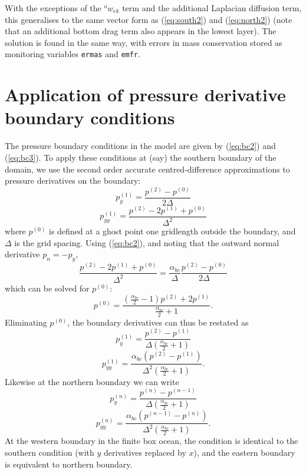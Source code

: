 \documentclass[11pt, a4paper,twoside]{article}
\newcommand{\ek}[1]{{{}^{#1}w_{ek}}}
\newcommand{\alphbc}[1]{{}^{#1}\alpha_{bc}}
\numberwithin{equation}{section}
\begin{document}
With the exceptions of the $\ek{o}$ term and the additional Laplacian diffusion term, this generalises to the same vector form as (\ref{eq:south2}) and (\ref{eq:north2}) (note that an additional bottom drag term also appears in the lowest layer).
The solution is found in the same way, with errors in mass conservation stored as monitoring variables \verb=ermas= and \verb=emfr=.


\section{Application of pressure derivative boundary conditions}\label{app:bcs}
The pressure boundary conditions in the model are given by (\ref{eq:bc2}) and (\ref{eq:bc3}).
To apply these conditions at (say) the southern boundary of the domain, we use the second order accurate centred-difference approximations to pressure derivatives on the boundary:
\begin{equation}
p^{(1)}_y = \frac{p^{(2)} - p^{(0)}}{2 \Delta}
\end{equation}
\begin{equation}
p^{(1)}_{yy} = \frac{p^{(2)} -2p^{(1)} + p^{(0)}}{\Delta^2}
\end{equation}
where $p^{(0)}$ is defined at a ghost point one gridlength outside the boundary, and $\Delta$ is the grid spacing.
Using (\ref{eq:bc2}), and noting that the outward normal derivative $p_n = -p_y$,
\begin{equation}
\frac{p^{(2)} -2p^{(1)} + p^{(0)}}{\Delta^2} = \frac{\alphbc{}}{\Delta} \frac{p^{(2)} - p^{(0)}}{2 \Delta}\end{equation}
which can be solved for $p^{(0)}$:
\begin{equation}p^{(0)} = \frac{(\frac{\alphbc{}}{2} - 1)p^{(2)} + 2p^{(1)}}{\frac{\alphbc{}}{2} + 1}.\end{equation}
Eliminating $p^{(0)}$, the boundary derivatives can thus be restated as
\begin{equation}p^{(1)}_y = \frac{p^{(2)} - p^{(1)}}{\Delta (\frac{\alphbc{}}{2} + 1)}\end{equation}
\begin{equation}p^{(1)}_{yy} = \frac{\alphbc{} (p^{(2)} - p^{(1)})}{\Delta^2 (\frac{\alphbc{}}{2} + 1)}.\end{equation}
Likewise at the northern boundary we can write
\begin{equation}p^{(n)}_y = \frac{p^{(n)} - p^{(n-1)}}{\Delta (\frac{\alphbc{} }{2} + 1)}\end{equation}
\begin{equation}p^{(n)}_{yy} = \frac{\alphbc{}  (p^{(n-1)} - p^{(n)})}{\Delta^2 (\frac{\alphbc{} }{2} + 1)}.\end{equation}
At the western boundary in the finite box ocean, the condition is identical to the southern condition (with $y$ derivatives replaced by $x$), and the eastern boundary is equivalent to northern boundary.
\end{document}
